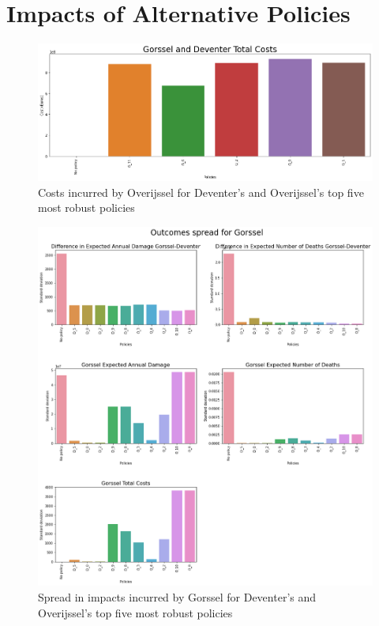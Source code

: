 \section{Impacts of Alternative Policies}
\label{a:impacts_policies}

\begin{figure}[h!]
    \centering
    \includegraphics[width=\textwidth]{report/figures/results/spreads/cost_policies_Overijssel.png}
    \caption{Costs incurred by Overijssel for Deventer's and Overijssel's top five most robust policies}
    \label{fig:cost-pol-o}
\end{figure}

\begin{figure}[h!]
    \centering
    \includegraphics[width=\textwidth]{report/figures/results/spreads/outcome_spreads_Gorssel.png}
    \caption{Spread in impacts incurred by Gorssel for Deventer's and Overijssel's top five most robust policies}
    \label{fig:impacts_gorss}
\end{figure}

